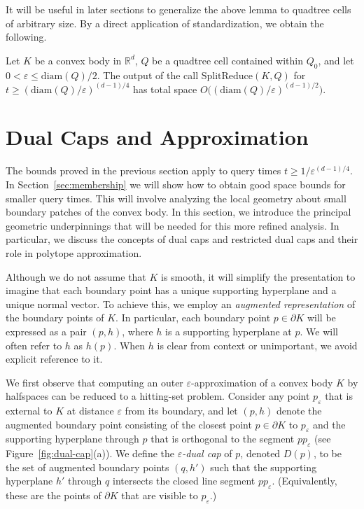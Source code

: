 \documentclass[11pt]{article}   \usepackage[letterpaper,hmargin=2.1cm,vmargin=3cm]{geometry}
\newcommand{\RE}{\mathbb{R}}    \newcommand{\ZZ}{\mathbb{Z}}    \newcommand{\eps}{\varepsilon}  \newcommand{\ST}{\,:\,}         \newcommand{\sq}{\square}
\newcommand{\alg}{\textrm{SplitReduce}}
\newcommand{\diam}{\mathrm{diam}}
\begin{document}
It will be useful in later sections to generalize the above lemma to quadtree cells of arbitrary size. By a direct application of standardization, we obtain the following.

\begin{lemma} \label{lem:firstbound}
Let $K$ be a convex body in $\RE^d$, $Q$ be a quadtree cell contained within $Q_0$, and let $0 < \eps \le \diam(Q)/2$. The output of the call $\alg(K,Q)$ for $t \geq (\diam(Q)/\eps)^{(d-1)/4}$ has total space $O\big((\diam(Q)/\eps)^{(d-1)/2}\big)$.
\end{lemma}


\section{Dual Caps and Approximation} \label{sec:cap}


The bounds proved in the previous section apply to query times $t \geq 1/\eps^{(d-1)/4}$. In Section~\ref{sec:membership} we will show how to obtain good space bounds for smaller query times. This will involve analyzing the local geometry about small boundary patches of the convex body. In this section, we introduce the principal geometric underpinnings that will be needed for this more refined analysis. In particular, we discuss the concepts of dual caps and restricted dual caps and their role in polytope approximation.

Although we do not assume that $K$ is smooth, it will simplify the presentation to imagine that each boundary point has a unique supporting hyperplane and a unique normal vector. To achieve this, we employ an \emph{augmented representation} of the boundary points of $K$. In particular, each boundary point $p \in \partial K$ will be expressed as a pair $(p,h)$, where $h$ is a supporting hyperplane at $p$. We will often refer to $h$ as $h(p)$. When $h$ is clear from context or unimportant, we avoid explicit reference to it.

We first observe that computing an outer $\eps$-approximation of a convex body $K$ by halfspaces can be reduced to a hitting-set problem. Consider any point $p_{\eps}$ that is external to $K$ at distance $\eps$ from its boundary, and let $(p,h)$ denote the augmented boundary point consisting of the closest point $p \in \partial K$ to $p_{\eps}$ and the supporting hyperplane through $p$ that is orthogonal to the segment $p p_{\eps}$ (see Figure~\ref{fig:dual-cap}(a)). We define the \emph{$\eps$-dual cap} of $p$, denoted $D(p)$, to be the set of augmented boundary points $(q,h')$ such that the supporting hyperplane $h'$ through $q$ intersects the closed line segment $p p_{\eps}$. (Equivalently, these are the points of $\partial K$ that are visible to $p_{\eps}$.) 
\end{document}
